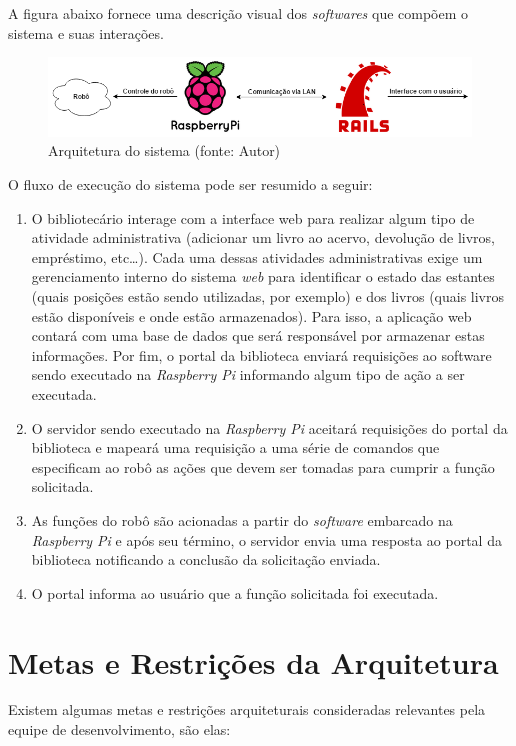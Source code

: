 A figura abaixo fornece uma descrição visual dos \textit{softwares} que compõem o sistema e suas interações.

\begin{figure}[!h]
\centering
\includegraphics[scale=0.50, angle = 360]{figuras/arquitetura_1}
\caption[]{Arquitetura do sistema (fonte: Autor)}
\end{figure}
\FloatBarrier

O fluxo de execução do sistema pode ser resumido a seguir:

\begin{enumerate}
    \item O bibliotecário interage com a interface web para realizar algum tipo de atividade administrativa (adicionar um livro ao acervo, devolução de livros, empréstimo, etc…). Cada uma dessas atividades administrativas exige um gerenciamento interno do sistema \textit{web} para identificar o estado das estantes (quais posições estão sendo utilizadas, por exemplo) e dos livros (quais livros estão disponíveis e onde estão armazenados). Para isso, a aplicação web contará com uma base de dados que será responsável por armazenar estas informações. Por fim, o portal da biblioteca enviará requisições ao software sendo executado na \textit{Raspberry Pi} informando algum tipo de ação a ser executada.

    \item O servidor sendo executado na \textit{Raspberry Pi} aceitará requisições do portal da biblioteca e mapeará uma requisição a uma série de comandos que especificam ao robô as ações que devem ser tomadas para cumprir a função solicitada.

    \item As funções do robô são acionadas a partir do \textit{software} embarcado na \textit{Raspberry Pi} e após seu término, o servidor envia uma resposta ao portal da biblioteca notificando a conclusão da solicitação enviada.

    \item O portal informa ao usuário que a função solicitada foi executada.
\end{enumerate}

\section{Metas e Restrições da Arquitetura}
Existem algumas metas e restrições arquiteturais consideradas relevantes pela equipe de desenvolvimento, são elas:

